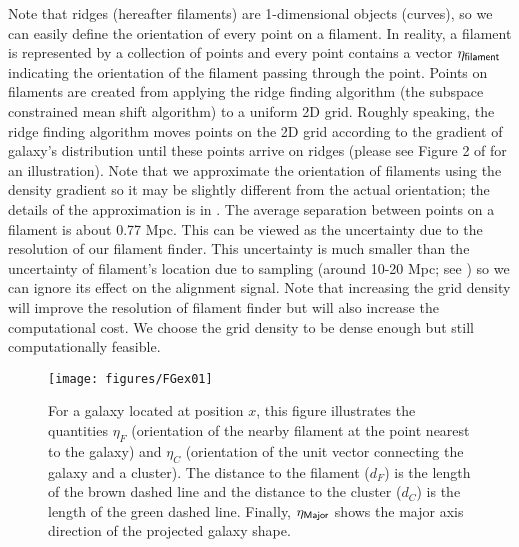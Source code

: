 \documentclass[usenatbib,useAMS]{mnras}
\theoremstyle{remark}
\begin{document}
        
        Note that ridges (hereafter filaments) are 1-dimensional objects (curves),
        so we can easily define the orientation of every point on a filament. 
        In reality, a filament is represented by a collection of points
        and every point
        contains a vector $\eta_{\sf filament}$ indicating
        the orientation of the filament passing through the point.
        {
        Points on filaments are created from applying the ridge finding algorithm
        (the subspace constrained mean shift algorithm) to a uniform 2D grid. 
        Roughly speaking, the ridge finding algorithm moves points on the 2D grid according to the 
        gradient of galaxy's distribution until these points arrive on ridges 
        (please see Figure 2 of \citealt{2015MNRAS.454.1140C} for an illustration). 
        Note that we approximate the orientation of filaments using the density gradient so
            it may be slightly different from the actual orientation; the details of the approximation is in \cite{2016MNRAS.461.3896C}. 
        The average separation between points on a filament is about 0.77 Mpc.
        This can be viewed as the uncertainty due to the resolution of our filament finder.
        This uncertainty is much smaller than the uncertainty of filament's location due to sampling 
        (around 10-20 Mpc; see
        \citealt{2016MNRAS.461.3896C}) so we can ignore its effect on the alignment signal.
        Note that increasing the grid density will improve the resolution of filament finder but will also increase 
        the computational cost. We choose the grid density to be dense enough but still computationally feasible. }

                
        \begin{figure}
	        \texttt{[image: figures/FGex01]}
    	    \caption{For a galaxy located at position $x$, this figure illustrates the quantities
              $\eta_F$ (orientation of the nearby filament at the
              point nearest to the galaxy) and $\eta_C$ (orientation of the unit vector connecting
              the galaxy and a cluster).
	        The distance to the filament ($d_F$) is the length of the brown dashed line
    	    and the distance to the cluster ($d_C$) is the length of the green dashed line.
            Finally, $\eta_{\sf Major}$ shows the major axis direction of the projected galaxy shape.}
        	\label{eq::ex01}
        \end{figure}
        
\end{document}
